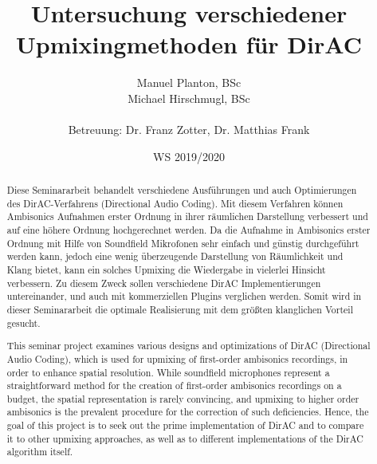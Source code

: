 \documentclass[12pt, a4paper]{article}
\begin{document}

\title{Untersuchung verschiedener Upmixingmethoden für DirAC}

\author{Manuel Planton, BSc \\ Michael Hirschmugl, BSc\\\\\small{Betreuung: Dr. Franz Zotter, Dr. Matthias Frank}}



\date{WS 2019/2020}

\maketitle
\newpage
\pagestyle{empty}
\hspace{1cm}\vspace{3cm}

\hspace{1cm}\vspace{1cm}

\begin{abstract}
   Diese Seminararbeit behandelt verschiedene Ausführungen und auch Optimierungen des DirAC-Verfahrens (Directional Audio Coding). Mit diesem Verfahren können Ambisonics Aufnahmen erster Ordnung in ihrer räumlichen Darstellung verbessert und auf eine höhere Ordnung hochgerechnet werden.
   Da die Aufnahme in Ambisonics erster Ordnung mit Hilfe von Soundfield Mikrofonen sehr einfach und günstig durchgeführt werden kann, jedoch eine wenig überzeugende Darstellung von Räumlichkeit und Klang bietet, kann ein solches Upmixing die Wiedergabe in vielerlei Hinsicht verbessern.
   Zu diesem Zweck sollen verschiedene DirAC Implementierungen untereinander, und auch mit kommerziellen Plugins verglichen werden. Somit wird in dieser Seminararbeit die optimale Realisierung mit dem größten klanglichen Vorteil gesucht.
\end{abstract}
\begin{abstract}
   This seminar project examines various designs and optimizations of DirAC (Directional Audio Coding), which is used for upmixing of first-order ambisonics recordings, in order to enhance spatial resolution.
   While soundfield microphones represent a straightforward method for the creation of first-order ambisonics recordings on a budget, the spatial representation is rarely convincing, and upmixing to higher order ambisonics is the prevalent procedure for the correction of such deficiencies.
   Hence, the goal of this project is to seek out the prime implementation of DirAC and to compare it to other upmixing approaches, as well as to different implementations of the DirAC algorithm itself.
\end{abstract}
\newpage
\pagestyle{myheadings}
\hspace{1cm}\vspace{2cm}
\end{document}
